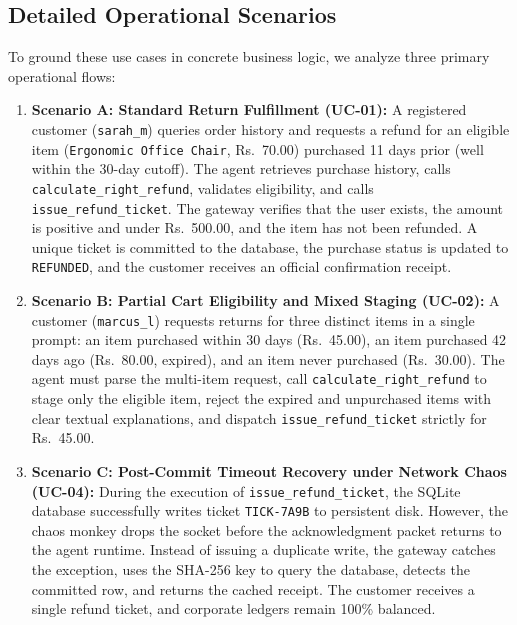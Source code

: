 \subsection{Detailed Operational Scenarios}

To ground these use cases in concrete business logic, we analyze three primary operational flows:

\begin{enumerate}
    \item \textbf{Scenario A: Standard Return Fulfillment (UC-01):}
    A registered customer (\texttt{sarah\_m}) queries order history and requests a refund for an eligible item (\texttt{Ergonomic Office Chair}, Rs.~70.00) purchased 11 days prior (well within the 30-day cutoff). The agent retrieves purchase history, calls \texttt{calculate\_right\_refund}, validates eligibility, and calls \texttt{issue\_refund\_ticket}. The gateway verifies that the user exists, the amount is positive and under Rs.~500.00, and the item has not been refunded. A unique ticket is committed to the database, the purchase status is updated to \texttt{REFUNDED}, and the customer receives an official confirmation receipt.

    \item \textbf{Scenario B: Partial Cart Eligibility and Mixed Staging (UC-02):}
    A customer (\texttt{marcus\_l}) requests returns for three distinct items in a single prompt: an item purchased within 30 days (Rs.~45.00), an item purchased 42 days ago (Rs.~80.00, expired), and an item never purchased (Rs.~30.00). The agent must parse the multi-item request, call \texttt{calculate\_right\_refund} to stage only the eligible item, reject the expired and unpurchased items with clear textual explanations, and dispatch \texttt{issue\_refund\_ticket} strictly for Rs.~45.00.

    \item \textbf{Scenario C: Post-Commit Timeout Recovery under Network Chaos (UC-04):}
    During the execution of \texttt{issue\_refund\_ticket}, the SQLite database successfully writes ticket \texttt{TICK-7A9B} to persistent disk. However, the chaos monkey drops the socket before the acknowledgment packet returns to the agent runtime. Instead of issuing a duplicate write, the gateway catches the exception, uses the SHA-256 key to query the database, detects the committed row, and returns the cached receipt. The customer receives a single refund ticket, and corporate ledgers remain 100\% balanced.
\end{enumerate}

